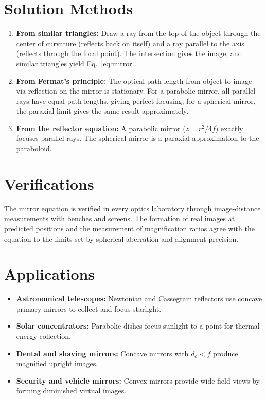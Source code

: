 \section*{Solution Methods}

\begin{enumerate}
  \item \textbf{From similar triangles:} Draw a ray from the top of the object through the center of curvature (reflects back on itself) and a ray parallel to the axis (reflects through the focal point). The intersection gives the image, and similar triangles yield Eq.~\eqref{eq:mirror}.
  \item \textbf{From Fermat's principle:} The optical path length from object to image via reflection on the mirror is stationary. For a parabolic mirror, all parallel rays have equal path lengths, giving perfect focusing; for a spherical mirror, the paraxial limit gives the same result approximately.
  \item \textbf{From the reflector equation:} A parabolic mirror ($z = r^{2}/4f$) exactly focuses parallel rays. The spherical mirror is a paraxial approximation to the paraboloid.
\end{enumerate}
\section*{Verifications}

The mirror equation is verified in every optics laboratory through image-distance measurements with benches and screens. The formation of real images at predicted positions and the measurement of magnification ratios agree with the equation to the limits set by spherical aberration and alignment precision.
\section*{Applications}

\begin{itemize}
  \item \textbf{Astronomical telescopes:} Newtonian and Cassegrain reflectors use concave primary mirrors to collect and focus starlight.
  \item \textbf{Solar concentrators:} Parabolic dishes focus sunlight to a point for thermal energy collection.
  \item \textbf{Dental and shaving mirrors:} Concave mirrors with $d_{o} < f$ produce magnified upright images.
  \item \textbf{Security and vehicle mirrors:} Convex mirrors provide wide-field views by forming diminished virtual images.
\end{itemize}
